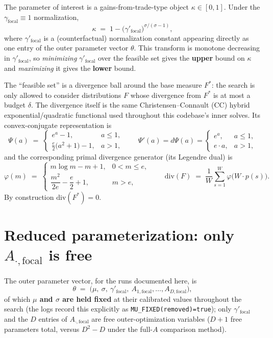 \documentclass[11pt]{article}
\begin{document}
The parameter of interest is a gains-from-trade-type object $\kappa\in[0,1]$. Under the
$\gamma_{\text{focal}}\equiv1$ normalization,
\[
\kappa \;=\; 1-\big(\gamma'_{\text{focal}}\big)^{\sigma/(\sigma-1)},
\]
where $\gamma'_{\text{focal}}$ is a (counterfactual) normalization constant appearing directly as
one entry of the outer parameter vector $\theta$. This transform is monotone decreasing in
$\gamma'_{\text{focal}}$, so \emph{minimizing} $\gamma'_{\text{focal}}$ over the feasible set gives
the \textbf{upper} bound on $\kappa$ and \emph{maximizing} it gives the \textbf{lower} bound.

The ``feasible set'' is a divergence ball around the base measure $F^*$: the search is only allowed
to consider distributions $F$ whose divergence from $F^*$ is at most a budget $\delta$. The
divergence itself is the same Christensen--Connault (CC) hybrid exponential/quadratic functional
used throughout this codebase's inner solves. Its convex-conjugate representation is
\[
\Psi(a) \;=\;
\begin{cases}
e^{a}-1, & a\le 1,\\[2pt]
\tfrac{e}{2}\big(a^2+1\big)-1, & a>1,
\end{cases}
\qquad
\Psi'(a)=d\Psi(a)=
\begin{cases}
e^{a}, & a\le 1,\\
e\cdot a, & a>1,
\end{cases}
\]
and the corresponding primal divergence generator (its Legendre dual) is
\[
\varphi(m) \;=\;
\begin{cases}
m\log m - m + 1, & 0<m\le e,\\[2pt]
\dfrac{m^2}{2e}-\dfrac{e}{2}+1, & m>e,
\end{cases}
\qquad
\mathrm{div}(F) \;=\; \frac{1}{W}\sum_{s=1}^{W}\varphi\big(W\cdot p(s)\big).
\]
By construction $\mathrm{div}(F^*)=0$.

\section{Reduced parameterization: only $A_{\cdot,\text{focal}}$ is free}
\label{sec:reduced}

The outer parameter vector, for the runs documented here, is
\[
\theta \;=\; \big(\mu,\ \sigma,\ \gamma'_{\text{focal}},\ A_{1,\text{focal}},\dots,A_{D,\text{focal}}\big),
\]
of which \textbf{$\mu$ and $\sigma$ are held fixed} at their calibrated values throughout the search
(the logs record this explicitly as \texttt{MU\_FIXED(removed)=true}); only $\gamma'_{\text{focal}}$
and the $D$ entries of $A_{\cdot,\text{focal}}$ are free outer-optimization variables ($D+1$ free
parameters total, versus $D^2-D$ under the full-$A$ comparison method).
\end{document}
